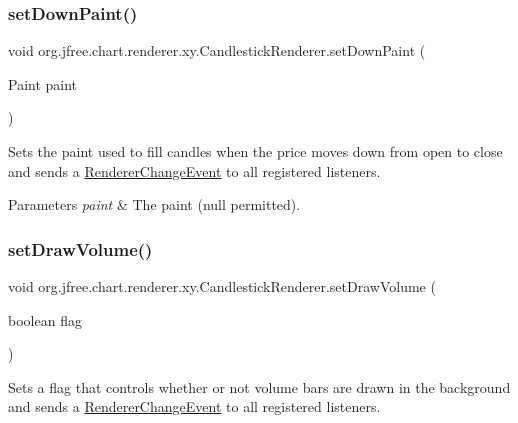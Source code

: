 \subsubsection{\texorpdfstring{set\+Down\+Paint()}{setDownPaint()}}
{\footnotesize\ttfamily void org.\+jfree.\+chart.\+renderer.\+xy.\+Candlestick\+Renderer.\+set\+Down\+Paint (\begin{DoxyParamCaption}\item[{Paint}]{paint }\end{DoxyParamCaption})}

Sets the paint used to fill candles when the price moves down from open to close and sends a \mbox{\hyperlink{}{Renderer\+Change\+Event}} to all registered listeners.


\begin{DoxyParams}{Parameters}
{\em paint} & The paint ({\ttfamily null} permitted). \\
\hline
\end{DoxyParams}
\mbox{\label{classorg_1_1jfree_1_1chart_1_1renderer_1_1xy_1_1_candlestick_renderer_ae3b4de230818ae0c8278052b9a1722f3}} 
\subsubsection{\texorpdfstring{set\+Draw\+Volume()}{setDrawVolume()}}
{\footnotesize\ttfamily void org.\+jfree.\+chart.\+renderer.\+xy.\+Candlestick\+Renderer.\+set\+Draw\+Volume (\begin{DoxyParamCaption}\item[{boolean}]{flag }\end{DoxyParamCaption})}

Sets a flag that controls whether or not volume bars are drawn in the background and sends a \mbox{\hyperlink{}{Renderer\+Change\+Event}} to all registered listeners.


